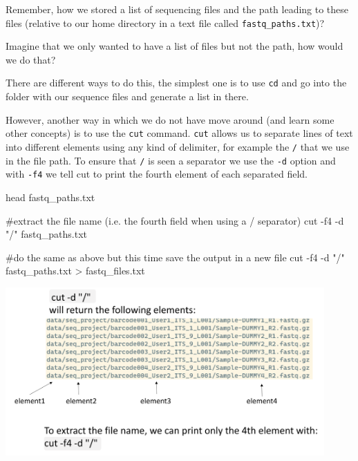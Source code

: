 \documentclass[
  letterpaper,
  DIV=11,
  numbers=noendperiod]{scrreprt}
\newenvironment{Shaded}{}{}
\newcommand{\AttributeTok}[1]{\textcolor[rgb]{0.84,0.23,0.29}{#1}}
\newcommand{\CommentTok}[1]{\textcolor[rgb]{0.42,0.45,0.49}{#1}}
\newcommand{\FunctionTok}[1]{\textcolor[rgb]{0.44,0.26,0.76}{#1}}
\newcommand{\NormalTok}[1]{\textcolor[rgb]{0.14,0.16,0.18}{#1}}
\newcommand{\OperatorTok}[1]{\textcolor[rgb]{0.14,0.16,0.18}{#1}}
\newcommand{\StringTok}[1]{\textcolor[rgb]{0.01,0.18,0.38}{#1}}
\begin{document}
Remember, how we stored a list of sequencing files and the path leading
to these files (relative to our home directory in a text file called
\texttt{fastq\_paths.txt})?

Imagine that we only wanted to have a list of files but not the path,
how would we do that?

There are different ways to do this, the simplest one is to use
\texttt{cd} and go into the folder with our sequence files and generate
a list in there.

However, another way in which we do not have move around (and learn some
other concepts) is to use the \texttt{cut} command. \texttt{cut} allows
us to separate lines of text into different elements using any kind of
delimiter, for example the \texttt{/} that we use in the file path. To
ensure that \texttt{/} is seen a separator we use the \texttt{-d} option
and with \texttt{-f4} we tell cut to print the fourth element of each
separated field.

\begin{Shaded}
\begin{Highlighting}[]
\FunctionTok{head}\NormalTok{ fastq\_paths.txt}

\CommentTok{\#extract the file name (i.e. the fourth field when using a / separator)}
\FunctionTok{cut} \AttributeTok{{-}f4} \AttributeTok{{-}d} \StringTok{"/"}\NormalTok{ fastq\_paths.txt}

\CommentTok{\#do the same as above but this time save the output in a new file}
\FunctionTok{cut} \AttributeTok{{-}f4} \AttributeTok{{-}d} \StringTok{"/"}\NormalTok{ fastq\_paths.txt }\OperatorTok{\textgreater{}}\NormalTok{ fastq\_files.txt}
\end{Highlighting}
\end{Shaded}

\includegraphics[width=4.80208in,height=\textheight]{../img/cut_1.pnd.png}
\end{document}
